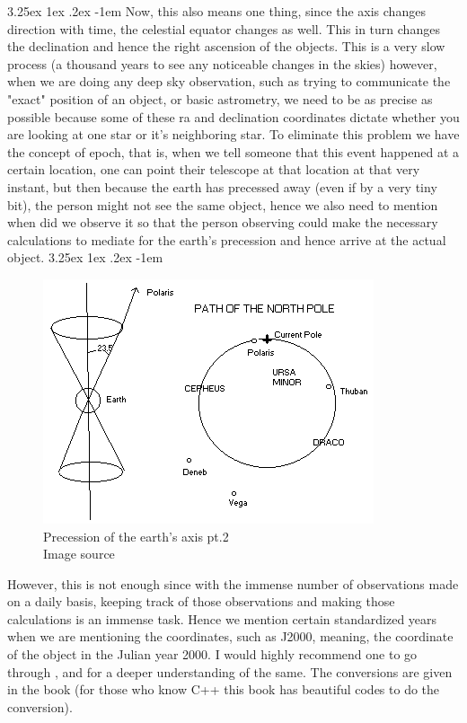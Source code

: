 \documentclass[a4paper,twoside,11pt]{article}
\makeatletter
\numberwithin{equation}{section}
\renewcommand\paragraph{\@startsection{paragraph}{5}{\z@}%
  {3.25ex \@plus1ex \@minus.2ex}%
  {-1em}%
  {\normalfont\normalsize\bfseries}}
\makeatother
\begin{document}
\paragraph{}
Now, this also means one thing, since the axis changes direction with time, the celestial equator changes as well. This in turn changes the declination and hence the right ascension of the objects. This is a very slow process (a thousand years to see any noticeable changes in the skies) however, when we are doing any deep sky observation, such as trying to communicate the "exact" position of an object, or basic astrometry, we need to be as precise as possible because some of these ra and declination coordinates dictate whether you are looking at one star or it's neighboring star. To eliminate this problem we have the concept of epoch, that is, when we tell someone that this event happened at a certain location, one can point their telescope at that location at that very instant, but then because the earth has precessed away (even if by a very tiny bit), the person might not see the same object, hence we also need to mention when did we observe it so that the person observing could make the necessary calculations to mediate for the earth's precession and hence arrive at the actual object. 
\paragraph{}
\begin{figure}
\begin{center}
\includegraphics[width=0.8\linewidth]{fig5.png} 
\caption{Precession of the earth's axis pt.2 \\ Image source \cite{precession3}}
\label{fig5}
\end{center}
\end{figure}
However, this is not enough since with the immense number of observations made on a daily basis, keeping track of those observations and making those calculations is an immense task. Hence we mention certain standardized years when we are mentioning the coordinates, such as J2000, meaning, the coordinate of the object in the Julian year 2000. I would highly recommend one to go through \cite{epoch1}, \cite{epoch2} and \cite{epoch3} for a deeper understanding of the same. The conversions are given in the book \cite{epoch4} (for those who know C++ this book has beautiful codes to do the conversion). 
\end{document}
